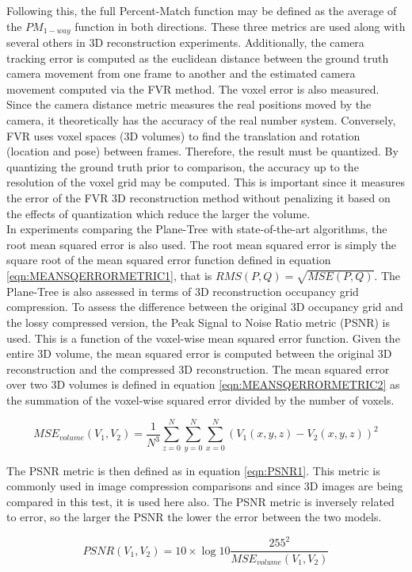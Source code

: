 Following this, the full Percent-Match function may be defined as the average of the $PM_{1-way}$ function in both directions. These three metrics are used along with several others in 3D reconstruction experiments. Additionally, the camera tracking error is computed as the euclidean distance between the ground truth camera movement from one frame to another and the estimated camera movement computed via the FVR method. The voxel error is also measured. Since the camera distance metric measures the real positions moved by the camera, it theoretically has the accuracy of the real number system. Conversely, FVR uses voxel spaces (3D volumes) to find the translation and rotation (location and pose) between frames. Therefore, the result must be quantized. By quantizing the ground truth prior to comparison, the accuracy up to the resolution of the voxel grid may be computed. This is important since it measures the error of the FVR 3D reconstruction method without penalizing it based on the effects of quantization which reduce the larger the volume. \\

In experiments comparing the Plane-Tree with state-of-the-art algorithms, the root mean squared error is also used. The root mean squared error is simply the square root of the mean squared error function defined in equation \ref{eqn:MEANSQERRORMETRIC1}, that is $RMS(P,Q) = \sqrt{MSE(P,Q)}$. The Plane-Tree is also assessed in terms of 3D reconstruction occupancy grid compression. To assess the difference between the original 3D occupancy grid and the lossy compressed version, the Peak Signal to Noise Ratio metric (PSNR) is used. This is a function of the voxel-wise mean squared error function. Given the entire 3D volume, the mean squared error is computed between the original 3D reconstruction and the compressed 3D reconstruction. The mean squared error over two 3D volumes is defined in equation \ref{eqn:MEANSQERRORMETRIC2} as the summation of the voxel-wise squared error divided by the number of voxels.

\begin{equation} \label{eqn:MEANSQERRORMETRIC2}
MSE_{volume}(V_1,V_2) = \frac{1}{N^3}\sum_{z=0}^{N}\sum_{y=0}^{N}\sum_{x=0}^{N} \left(V_1(x,y,z) - V_2(x,y,z)\right)^2
\end{equation}

The PSNR metric is then defined as in equation \ref{eqn:PSNR1}. This metric is commonly used in image compression comparisons and since 3D images are being compared in this test, it is used here also. The PSNR metric is inversely related to error, so the larger the PSNR the lower the error between the two models.

\begin{equation} \label{eqn:PSNR1}
PSNR(V_1,V_2) = 10 \times \log10{\frac{255^2}{MSE_{volume}(V_1, V_2)}}
\end{equation}
